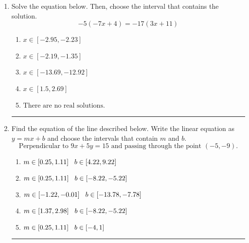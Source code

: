 \documentclass[14pt]{extbook}
\newcommand{\litem}[1]{\item#1\hspace*{-1cm}\rule{\textwidth}{0.4pt}}
\begin{document}
\begin{enumerate}
{\begin{enumerate}[label=\Alph*.]
\end{enumerate} }
\litem{
Solve the equation below. Then, choose the interval that contains the solution.\[ -5(-7x + 4) = -17(3x + 11) \]\begin{enumerate}[label=\Alph*.]
\item \( x \in [-2.95, -2.23] \)
\item \( x \in [-2.19, -1.35] \)
\item \( x \in [-13.69, -12.92] \)
\item \( x \in [1.5, 2.69] \)
\item \( \text{There are no real solutions.} \)

\end{enumerate} }
\litem{
Find the equation of the line described below. Write the linear equation as $ y=mx+b $ and choose the intervals that contain $m$ and $b$.\[ \text{Perpendicular to } 9 x + 5 y = 15 \text{ and passing through the point } (-5, -9). \]\begin{enumerate}[label=\Alph*.]
\item \( m \in [0.25, 1.11] \hspace*{3mm} b \in [4.22, 9.22] \)
\item \( m \in [0.25, 1.11] \hspace*{3mm} b \in [-8.22, -5.22] \)
\item \( m \in [-1.22, -0.01] \hspace*{3mm} b \in [-13.78, -7.78] \)
\item \( m \in [1.37, 2.98] \hspace*{3mm} b \in [-8.22, -5.22] \)
\item \( m \in [0.25, 1.11] \hspace*{3mm} b \in [-4, 1] \)


\end{enumerate}}
\end{enumerate}
\end{document}
